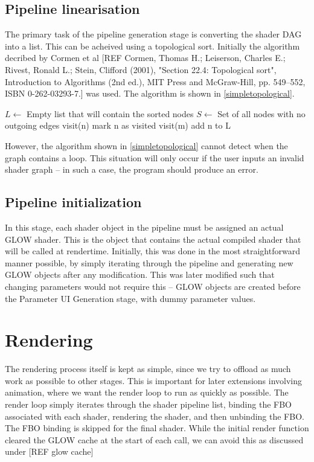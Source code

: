 \documentclass[12pt,twoside,notitlepage]{report}
\begin{document}
\subsection*{Pipeline linearisation}
The primary task of the pipeline generation stage is converting the shader DAG into a list. This can be acheived using a topological sort. Initially the algorithm decribed by Cormen et al \cite{topsort} [REF 
Cormen, Thomas H.; Leiserson, Charles E.; Rivest, Ronald L.; Stein, Clifford (2001), "Section 22.4: Topological sort", Introduction to Algorithms (2nd ed.), MIT Press and McGraw-Hill, pp. 549–552, ISBN 0-262-03293-7.] was used. The algorithm is shown in \ref{simpletopological}.
\begin{algorithm}
\label{simpletopological}
\begin{algorithmic}
\State $L \gets $ Empty list that will contain the sorted nodes
\State $S \gets $ Set of all nodes with no outgoing edges
    visit(n)
\EndFor 
{}
        mark n as visited
            visit(m)
        \EndFor
        add n to L
    \EndIf
\EndFunction
\end{algorithmic}
\end{algorithm}
However, the algorithm shown in \ref{simpletopological} cannot detect when the graph contains a loop. This situation will only occur if the user inputs an invalid shader graph -- in such a case, the program should produce an error.

\subsection*{Pipeline initialization}
In this stage, each shader object in the pipeline must be assigned an actual GLOW shader. This is the object that contains the actual compiled shader that will be called at rendertime. Initially, this was done in the most straightforward manner possible, by simply iterating through the pipeline and generating new GLOW objects after any modification. This was later modified such that changing parameters would not require this -- GLOW objects are created before the Parameter UI Generation stage, with dummy parameter values. 

\section{Rendering}
The rendering process itself is kept as simple, since we try to offload as much work as possible to other stages. This is important for later extensions involving animation, where we want the render loop to run as quickly as possible. The render loop simply iterates through the shader pipeline list, binding the FBO associated with each shader, rendering the shader, and then unbinding the FBO. The FBO binding is skipped for the final shader. While the initial render function cleared the GLOW cache at the start of each call, we can avoid this as discussed under [REF glow cache]
\end{document}
